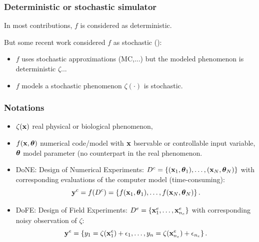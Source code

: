 \documentclass[nopagenumber,9pt]{beamer}
\begin{document}
\begin{frame}
 \frametitle{Deterministic or stochastic simulator}
 
 
 In most contributions, $f$ is considered as deterministic.
 
 \bigskip
 
 But some recent work considered $f$ as stochastic (\cite{baker}):
 
 
 \begin{itemize}
  \item $f$ uses stochastic approximations (MC,...) but the modeled phenomenon is deterministic $\zeta$...
  
  \medskip
  
  \item $f$ models a stochastic phenomenon $\zeta(\cdot)$ is stochastic.
  
 
 \end{itemize}

 
 
 
 
\end{frame}
%
%


\begin{frame}
 \frametitle{Notations}
 
 \begin{itemize}
  \item $\zeta(\mathbf{x})$ real physical or biological phenomenon,
  \item $f(\mathbf{x},\boldsymbol{\theta})$ numerical code/model with $\mathbf{x}$ bservable or controllable input variable, $\boldsymbol{\theta}$ model parameter (no counterpart in the real phenomenon.
  \item DoNE: Design of Numerical Experiments: $D^c=\{(\mathbf{x}_1,\boldsymbol{\theta}_1),\ldots,(\mathbf{x}_N,\boldsymbol{\theta}_N)\}$  %
with corresponding evaluations of the computer model (time-consuming):
$$\mathbf{y}^c=f(D^c)=\{f(\mathbf{x}_1,\boldsymbol{\theta}_1),\ldots,f(\mathbf{x}_N,\boldsymbol{\theta}_N)\}\,.$$


 \item DoFE: Design of Field Experiments: $D^e=\{\mathbf{x}^e_1,\ldots,\mathbf{x}^e_{n_e}\}$ with corresponding noisy observation of $\zeta$:$$\mathbf{y}^{e}=\{y_1=\zeta(\mathbf{x}^e_1)+\epsilon_1,\ldots,y_n=\zeta(\mathbf{x}^e_{n_e})+\epsilon_{n_e}\}\,.$$
 \end{itemize}

 
\end{frame}
\end{document}
